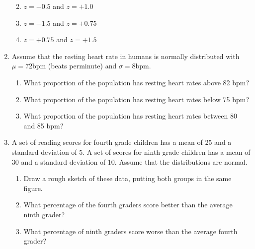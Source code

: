 \documentclass[]{article}
\providecommand{\tightlist}{%
  \setlength{\itemsep}{0pt}\setlength{\parskip}{0pt}}
\begin{document}
\begin{enumerate}
  \begin{enumerate}
  \def\labelenumii{\alph{enumii}.}
  \tightlist
  \item
    \(z = -0.5\) and \(z = +1.0\)
  \item
    \(z = -1.5\) and \(z = +0.75\)
  \item
    \(z = +0.75\) and \(z = +1.5\)
  \end{enumerate}
\item
  Assume that the resting heart rate in humans is normally distributed
  with \(\mu = 72\)bpm (beats perminute) and \(\sigma = 8\)bpm.

  \begin{enumerate}
  \def\labelenumii{\alph{enumii}.}
  \tightlist
  \item
    What proportion of the population has resting heart rates above 82
    bpm?
  \item
    What proportion of the population has resting heart rates below 75
    bpm?
  \item
    What proportion of the population has resting heart rates between 80
    and 85 bpm?
  \end{enumerate}
\item
  A set of reading scores for fourth grade children has a mean of 25 and
  a standard deviation of 5. A set of scores for ninth grade children
  has a mean of 30 and a standard deviation of 10. Assume that the
  distributions are normal.

  \begin{enumerate}
  \def\labelenumii{\alph{enumii}.}
  \tightlist
  \item
    Draw a rough sketch of these data, putting both groups in the same
    figure.
  \item
    What percentage of the fourth graders score better than the average
    ninth grader?
  \item
    What percentage of ninth graders score worse than the average fourth
    grader?
  \end{enumerate}
\end{enumerate}
\end{document}
